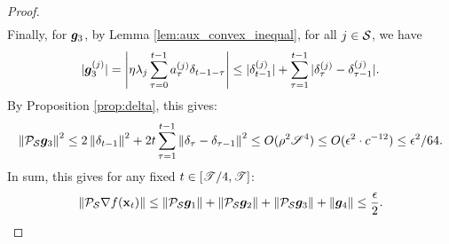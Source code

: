 \begin{proof}
\begin{align*}
\end{align*}
Finally, for $\g_3$, by Lemma \ref{lem:aux_convex_inequal}, for all $j\in \S$, we have
\begin{equation*}
|\g_3^{(j)}| = \left|\eta \lambda_j \sum_{\tau = 0}^{t-1}a^{(j)}_\tau \delta_{t-1-\tau}\right|
\le |\delta^{(j)}_{t-1}|+  \sum_{\tau=1}^{t-1} |\delta^{(j)}_\tau - \delta^{(j)}_{\tau-1}|.
\end{equation*}
By Proposition \ref{prop:delta}, this gives:
\begin{equation*}
\norm{\proj_\S \g_3}^2 \le 
2\norm{\delta_{t-1}}^2 + 2t\sum_{\tau = 1}^{t-1}\norm{\delta_\tau- \delta_{\tau-1}}^2 
\le O(\rho^2\uspace^4) \le O(\epsilon^2 \cdot c^{-12}) \le \epsilon^2/64.
\end{equation*}
In sum, this gives for any fixed $t \in [\utime/4, \utime]$:
\begin{equation*}
\norm{\proj_\S \grad f(\x_t)}\le \norm{\proj_\S \g_1} + \norm{\proj_\S \g_2} + \norm{\proj_\S \g_3} + \norm{\g_4} \le \frac{\epsilon}{2}.
\end{equation*}








\end{proof}
